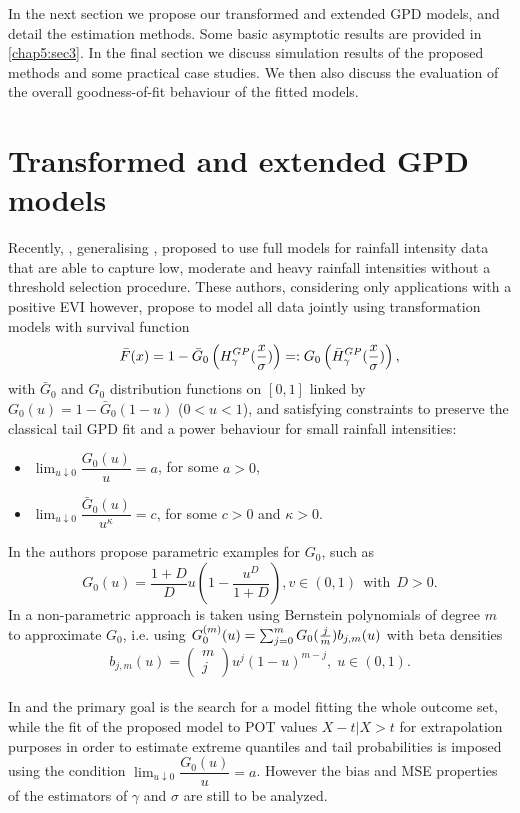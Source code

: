 In the next section we propose our transformed and extended GPD models, and detail the estimation methods. Some basic asymptotic results are provided in \autoref{chap5:sec3}. In the final section we discuss simulation results of the proposed methods and some practical case studies. We then also discuss the evaluation of the overall goodness-of-fit behaviour of the fitted models.  

\section{Transformed and extended GPD models}

Recently, \cite{naveau2016modeling}, generalising \cite{papastathopoulos2013extended}, proposed to use full models for rainfall intensity data that are able to capture low, moderate and heavy rainfall intensities without a threshold selection procedure. These authors, considering only applications with a positive EVI however, propose to model all data jointly using transformation models with survival function 
\begin{equation}
\bar{F}(x) = 1-\bar{G}_0 \left( H^{GP}_{\gamma} ({x \over \sigma})\right)=: G_0\left( \bar{H}^{GP}_{\gamma} ({x \over \sigma})\right),
\label{naveau}
\end{equation}
with $\bar{G}_0$ and $G_0$ distribution functions on $[0,1]$ linked by $G_0(u)=1-\bar{G}_0 (1-u)$ ($0<u<1$), and satisfying constraints to preserve the classical tail GPD fit and a power behaviour for small rainfall intensities:
\begin{itemize}
\item $\lim_{u \downarrow 0} \dfrac{G_0(u)}{u}=a$, for some $a>0$,
\item $\lim_{u \downarrow 0} \dfrac{\bar{G}_0(u)}{u^\kappa}=c$, for some $c>0$ and $\kappa >0$.
\end{itemize}
In \cite{naveau2016modeling} the authors propose parametric examples for $G_0$, such as 
$$G_0(u) = \dfrac{1+D}{D} u \left(1-\dfrac{u^D}{1+D}\right), v \in (0,1)\ \ \text{with}\ \ D>0.$$ 
In \cite{tencaliec2018flexible} a non-parametric approach is taken using Bernstein polynomials of degree $m$ to approximate $G_0$, i.e. using $G_{0}^{(m)} (u) = \sum_{j=0}^m G_0({j \over m})b_{j,m}(u)$ with beta densities
$$b_{j,m}(u)=\left( \begin{array}{c} m \\ j \end{array}\right)u^j (1-u)^{m-j},\; u \in (0,1).
$$ 
\\
In \cite{naveau2016modeling} and \cite{tencaliec2018flexible} the primary goal is the search for a model fitting the whole outcome set, while the fit of the proposed model to POT values $X-t |X>t$ for extrapolation purposes in order to estimate extreme quantiles and tail probabilities is imposed using the condition $\lim_{u \downarrow 0} \dfrac{G_0(u)}{u}=a$. However the bias and MSE properties of the estimators of $\gamma$ and $\sigma$ are still to be analyzed.\\


